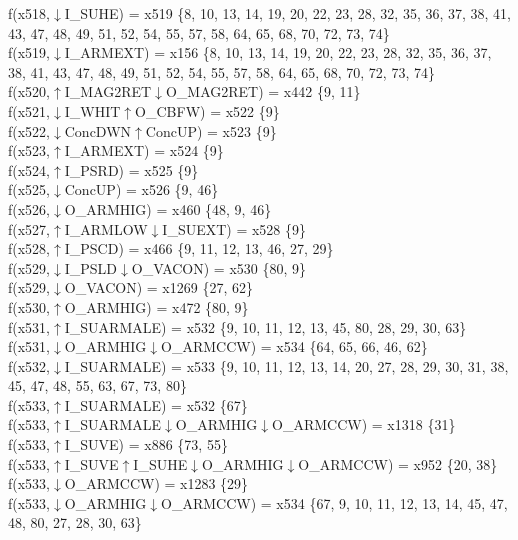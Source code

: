f(x518,$\downarrow$I\_SUHE) = x519 \{8, 10, 13, 14, 19, 20, 22, 23, 28, 32, 35, 36, 37, 38, 41, 43, 47, 48, 49, 51, 52, 54, 55, 57, 58, 64, 65, 68, 70, 72, 73, 74\} \\  
f(x519,$\downarrow$I\_ARMEXT) = x156 \{8, 10, 13, 14, 19, 20, 22, 23, 28, 32, 35, 36, 37, 38, 41, 43, 47, 48, 49, 51, 52, 54, 55, 57, 58, 64, 65, 68, 70, 72, 73, 74\} \\  
f(x520,$\uparrow$I\_MAG2RET$\downarrow$O\_MAG2RET) = x442 \{9, 11\} \\  
f(x521,$\downarrow$I\_WHIT$\uparrow$O\_CBFW) = x522 \{9\} \\  
f(x522,$\downarrow$ConcDWN$\uparrow$ConcUP) = x523 \{9\} \\  
f(x523,$\uparrow$I\_ARMEXT) = x524 \{9\} \\  
f(x524,$\uparrow$I\_PSRD) = x525 \{9\} \\  
f(x525,$\downarrow$ConcUP) = x526 \{9, 46\} \\  
f(x526,$\downarrow$O\_ARMHIG) = x460 \{48, 9, 46\} \\  
f(x527,$\uparrow$I\_ARMLOW$\downarrow$I\_SUEXT) = x528 \{9\} \\  
f(x528,$\uparrow$I\_PSCD) = x466 \{9, 11, 12, 13, 46, 27, 29\} \\  
f(x529,$\downarrow$I\_PSLD$\downarrow$O\_VACON) = x530 \{80, 9\} \\  
f(x529,$\downarrow$O\_VACON) = x1269 \{27, 62\} \\  
f(x530,$\uparrow$O\_ARMHIG) = x472 \{80, 9\} \\  
f(x531,$\uparrow$I\_SUARMALE) = x532 \{9, 10, 11, 12, 13, 45, 80, 28, 29, 30, 63\} \\  
f(x531,$\downarrow$O\_ARMHIG$\downarrow$O\_ARMCCW) = x534 \{64, 65, 66, 46, 62\} \\  
f(x532,$\downarrow$I\_SUARMALE) = x533 \{9, 10, 11, 12, 13, 14, 20, 27, 28, 29, 30, 31, 38, 45, 47, 48, 55, 63, 67, 73, 80\} \\  
f(x533,$\uparrow$I\_SUARMALE) = x532 \{67\} \\  
f(x533,$\uparrow$I\_SUARMALE$\downarrow$O\_ARMHIG$\downarrow$O\_ARMCCW) = x1318 \{31\} \\  
f(x533,$\uparrow$I\_SUVE) = x886 \{73, 55\} \\  
f(x533,$\uparrow$I\_SUVE$\uparrow$I\_SUHE$\downarrow$O\_ARMHIG$\downarrow$O\_ARMCCW) = x952 \{20, 38\} \\  
f(x533,$\downarrow$O\_ARMCCW) = x1283 \{29\} \\  
f(x533,$\downarrow$O\_ARMHIG$\downarrow$O\_ARMCCW) = x534 \{67, 9, 10, 11, 12, 13, 14, 45, 47, 48, 80, 27, 28, 30, 63\} \\  
